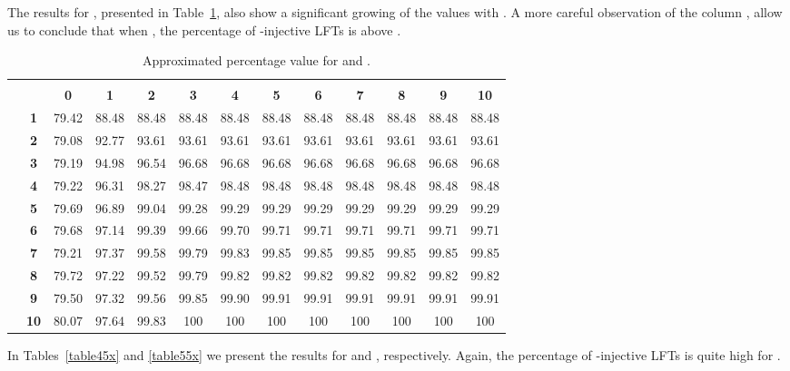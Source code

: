 \documentclass{ocg}
\newcommand{\LFT}{LFT}
\begin{document}
The results for , presented in Table~\ref{table35x}, also show a
significant growing of the values with . A  more
careful observation of the column  , allow us to conclude that
when  ,  the  percentage of  -injective \LFT{}s  is
above .
\begin{table}[h]
  \centering\scriptsize
  \begin{tabular}{|c|c|c|c|c|c|c|c|c|c|c|c|c|}\cline{3-13}
    \multicolumn{1}{c}{}&\multicolumn{1}{c}{} & \multicolumn{11}{|c|}{\footnotesize }\\
    \cline{3-13} 
    \multicolumn{2}{c|}{}&\bf 0&\bf1&\bf2&\bf3&\bf4&\bf5&\bf6&\bf7&\bf8&\bf9&\bf10\\\hline
    \multirow{10}{*}{\footnotesize }& \bf 1
    &79.42&88.48&88.48&88.48&88.48&88.48&88.48&88.48&88.48&88.48&88.48\\
    \cline{2-13}
    &\bf 2&79.08&92.77&93.61&93.61&93.61&93.61&93.61&93.61&93.61&93.61&93.61\\
    \cline{2-13}
    &\bf 3&79.19&94.98&96.54&96.68&96.68&96.68&96.68&96.68&96.68&96.68&96.68\\
    \cline{2-13}
    &\bf 4&79.22&96.31&98.27&98.47&98.48&98.48&98.48&98.48&98.48&98.48&98.48\\
    \cline{2-13}
    &\bf 5&79.69&96.89&99.04&99.28&99.29&99.29&99.29&99.29&99.29&99.29&99.29\\
    \cline{2-13}
    &\bf 6&79.68&97.14&99.39&99.66&99.70&99.71&99.71&99.71&99.71&99.71&99.71\\
    \cline{2-13}
    &\bf 7&79.21&97.37&99.58&99.79&99.83&99.85&99.85&99.85&99.85&99.85&99.85\\
    \cline{2-13}
    &\bf 8&79.72&97.22&99.52&99.79&99.82&99.82&99.82&99.82&99.82&99.82&99.82\\
    \cline{2-13}
    &\bf 9&79.50&97.32&99.56&99.85&99.90&99.91&99.91&99.91&99.91&99.91&99.91\\
    \cline{2-13}
    &\bf 10&80.07&97.64&99.83&100&100&100&100&100&100&100&100\\
    \hline
  \end{tabular}
  \caption{Approximated percentage value for  and .}
  \label{table35x}
\end{table}


In Tables~\ref{table45x} and \ref{table55x} we present the results for
 and , respectively. Again, the percentage of
-injective \LFT{}s is quite high for . 
\end{document}
